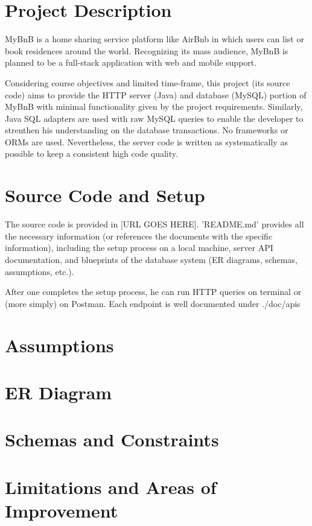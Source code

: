 \documentclass[11pt]{article}
\begin{document}
\pagestyle{fancy}
\fancyhead{}
\fancyfoot{}
\fancyfoot[R]{\thepage}

\section*{Project Description}

MyBnB is a home sharing service platform like AirBnb in which users can list or book
residences around the world. Recognizing its mass audience, MyBnB is planned to be
a full-stack application with web and mobile support.

Considering course objectives and limited time-frame, this project (its source code)
aims to provide the HTTP server (Java) and database (MySQL) portion of MyBnB with minimal functionality given by the
project requirements. Similarly, Java SQL adapters are used with raw MySQL queries
to enable the developer to strenthen his understanding on the database transactions. No frameworks or ORMs are used.
Nevertheless, the server code is written as systematically as possible to keep a consistent high code
quality.


\section*{Source Code and Setup}

The source code is provided in [URL GOES HERE]. 'README.md' provides all the necessary
information (or references the documents with the specific information), including the setup
process on a local machine, server API documentation, and blueprints of the database system
(ER diagrams, schemas, assumptions, etc.).

After one completes the setup process, he can run HTTP queries on terminal or (more simply)
on Postman. Each endpoint is well documented under ./doc/apis

\section*{Assumptions}

\section*{ER Diagram}

\section*{Schemas and Constraints}

\section*{Limitations and Areas of Improvement}
\end{document}
